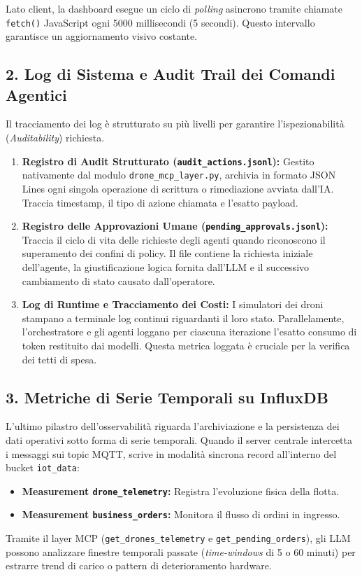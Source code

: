 Lato client, la dashboard esegue un ciclo di \textit{polling} asincrono tramite chiamate \texttt{fetch()} JavaScript ogni 5000 millisecondi (5 secondi). Questo intervallo garantisce un aggiornamento visivo costante.

\subsection*{2. Log di Sistema e Audit Trail dei Comandi Agentici}
Il tracciamento dei log è strutturato su più livelli per garantire l'ispezionabilità (\textit{Auditability}) richiesta.

\begin{enumerate}
    \item \textbf{Registro di Audit Strutturato (\texttt{audit\_actions.jsonl}):} Gestito nativamente dal modulo \texttt{drone\_mcp\_layer.py}, archivia in formato JSON Lines ogni singola operazione di scrittura o rimediazione avviata dall'IA. Traccia timestamp, il tipo di azione chiamata e l'esatto payload.
    \item \textbf{Registro delle Approvazioni Umane (\texttt{pending\_approvals.jsonl}):} Traccia il ciclo di vita delle richieste degli agenti quando riconoscono il superamento dei confini di policy. Il file contiene la richiesta iniziale dell'agente, la giustificazione logica fornita dall'LLM e il successivo cambiamento di stato causato dall'operatore.
    \item \textbf{Log di Runtime e Tracciamento dei Costi:} I simulatori dei droni stampano a terminale log continui riguardanti il loro stato. Parallelamente, l'orchestratore e gli agenti loggano per ciascuna iterazione l'esatto consumo di token restituito dai modelli. Questa metrica loggata è cruciale per la verifica dei tetti di spesa.
\end{enumerate}

\subsection*{3. Metriche di Serie Temporali su InfluxDB}
L'ultimo pilastro dell'osservabilità riguarda l'archiviazione e la persistenza dei dati operativi sotto forma di serie temporali. 
Quando il server centrale intercetta i messaggi sui topic MQTT, scrive in modalità sincrona record all'interno del bucket \texttt{iot\_data}:

\begin{itemize}
    \item \textbf{Measurement \texttt{drone\_telemetry}:} Registra l'evoluzione fisica della flotta.
    \item \textbf{Measurement \texttt{business\_orders}:} Monitora il flusso di ordini in ingresso.
\end{itemize}

Tramite il layer MCP (\texttt{get\_drones\_telemetry} e \texttt{get\_pending\_orders}), gli LLM possono analizzare finestre temporali passate (\textit{time-windows} di 5 o 60 minuti) per estrarre trend di carico o pattern di deterioramento hardware.